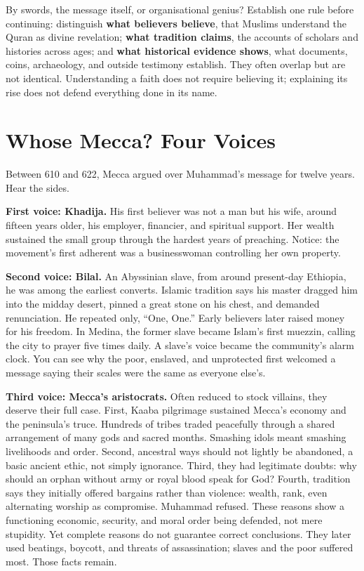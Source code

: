 By swords, the message itself, or organisational genius? Establish one rule before continuing: distinguish \textbf{what believers believe}, that Muslims understand the Quran as divine revelation; \textbf{what tradition claims}, the accounts of scholars and histories across ages; and \textbf{what historical evidence shows}, what documents, coins, archaeology, and outside testimony establish. They often overlap but are not identical. Understanding a faith does not require believing it; explaining its rise does not defend everything done in its name.

\section{Whose Mecca? Four Voices}
Between 610 and 622, Mecca argued over Muhammad's message for twelve years. Hear the sides.

\textbf{First voice: Khadija.} His first believer was not a man but his wife, around fifteen years older, his employer, financier, and spiritual support. Her wealth sustained the small group through the hardest years of preaching. Notice: the movement's first adherent was a businesswoman controlling her own property.

\textbf{Second voice: Bilal.} An Abyssinian slave, from around present-day Ethiopia, he was among the earliest converts. Islamic tradition says his master dragged him into the midday desert, pinned a great stone on his chest, and demanded renunciation. He repeated only, ``One, One.'' Early believers later raised money for his freedom. In Medina, the former slave became Islam's first muezzin, calling the city to prayer five times daily. A slave's voice became the community's alarm clock. You can see why the poor, enslaved, and unprotected first welcomed a message saying their scales were the same as everyone else's.

\textbf{Third voice: Mecca's aristocrats.} Often reduced to stock villains, they deserve their full case. First, Kaaba pilgrimage sustained Mecca's economy and the peninsula's truce. Hundreds of tribes traded peacefully through a shared arrangement of many gods and sacred months. Smashing idols meant smashing livelihoods and order. Second, ancestral ways should not lightly be abandoned, a basic ancient ethic, not simply ignorance. Third, they had legitimate doubts: why should an orphan without army or royal blood speak for God? Fourth, tradition says they initially offered bargains rather than violence: wealth, rank, even alternating worship as compromise. Muhammad refused. These reasons show a functioning economic, security, and moral order being defended, not mere stupidity. Yet complete reasons do not guarantee correct conclusions. They later used beatings, boycott, and threats of assassination; slaves and the poor suffered most. Those facts remain.

